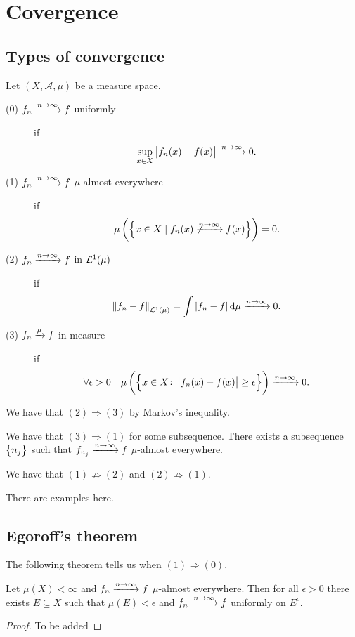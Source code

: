 \documentclass[11pt,a4paper]{article}
\newcommand{\A}{\mathcal A}
\begin{document}
\newpage

\section{Covergence}
\subsection{Types of convergence}
Let $(X,\A,\mu)$ be a measure space.
\begin{description}
  \item[(0) $f_n \xrightarrow{n \to \infty} f$ uniformly] if
    \[
      \sup_{x \in X} \left\lvert f_n(x) - f(x)\right\rvert \xrightarrow{n \to \infty} 0.
    \]
  \item[(1) $f_n \xrightarrow{n \to \infty} f$ $\mu$-almost everywhere] if
    \[
      \mu\del{\set{x \in X \mid f_n(x) \not\taking{n \to \infty} f(x)}} = 0.
    \]
  \item[(2) $f_n \xrightarrow{n \to \infty} f$ in $\mathcal{L}^1(\mu)$] if
    \[
      \left\lVert f_n - f\right\rVert_{\mathcal{L}^1(\mu)} =
      \int \left\lvert f_n - f\right\rvert \mathrm{d} \mu \xrightarrow{n \to \infty} 0.
    \]
  \item[(3) $f_n \xrightarrow{\mu} f$ in measure] if
    \[
      \forall \epsilon > 0 \quad
      \mu\del{\set{x \in X \colon \abs{f_n(x) - f(x)} \geq \epsilon}}
      \taking{n \to \infty} 0.
    \]
\end{description}
\begin{remark}
  We have that $(2) \Rightarrow (3)$ by Markov's inequality.
\end{remark}

\begin{remark}
  We have that $(3) \Rightarrow (1)$ for some subsequence.
  There exists a subsequence $\left\{n_j\right\}$ such that
  $f_{n_j} \xrightarrow{n \to \infty} f$ $\mu$-almost everywhere.
\end{remark}
\begin{remark}
  We have that $(1) \nRightarrow (2)$ and $(2) \nRightarrow (1)$.
\end{remark}

\begin{example}
  There are examples here.
\end{example}


\subsection{Egoroff's theorem}
\begin{remark}
  The following theorem tells us when $(1) \Rightarrow (0)$.
\end{remark}
\begin{theorem}
  Let $\mu(X) < \infty$ and
  $f_n \xrightarrow{n \to \infty} f$ $\mu$-almost everywhere.
  Then for all $\epsilon > 0$ there exists $E \subseteq X$ such
  that $\mu(E) < \epsilon$ and
  $f_n \xrightarrow{n \to \infty} f$ uniformly on $E^c$.
\end{theorem}
\begin{proof}
  To be added
\end{proof}
\end{document}
